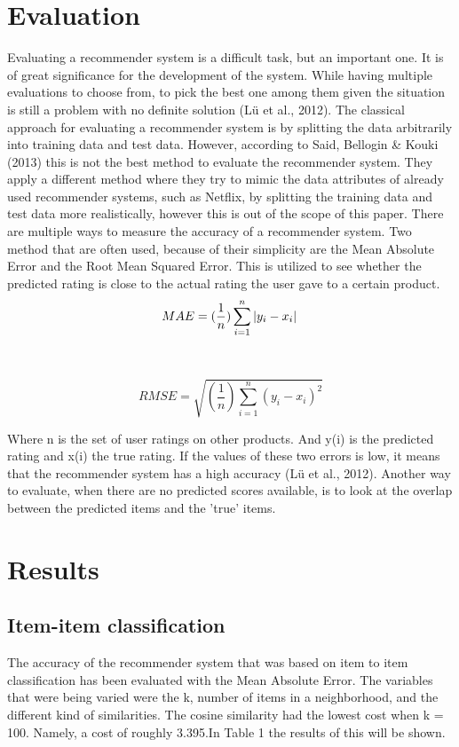 \documentclass[11pt]{article}
\begin{document}
\section{Evaluation}
Evaluating a recommender system is a difficult task, but an important one. It is of great significance for the development of the system. While having multiple evaluations to choose from, to pick the best one among them given the situation is still a problem with no definite solution (Lü et al., 2012).  The classical approach for evaluating a recommender system is by splitting the data arbitrarily into training data and test data. However, according to Said, Bellogin \& Kouki (2013) this is not the best method to evaluate the recommender system. They apply a different method where they try to mimic the data attributes of already used recommender systems, such as Netflix, by splitting the training data and test data more realistically, however this is out of the scope of this paper. There are multiple ways to measure the accuracy of a recommender system. Two method that are often used, because of their simplicity are the Mean Absolute Error and the Root Mean Squared Error. This is utilized to see whether the predicted rating is close to the actual rating the user gave to a certain product.\\

\m
$$MAE =  (\frac{1}{n})\sum_{i=1}^{n}\left | y_{i} - x_{i} \right |\\ $$\\
\\$$RMSE=\sqrt{(\frac{1}{n})\sum_{i=1}^{n}(y_{i} - x_{i})^{2}} $$

Where n is the set of user ratings on other products. And y(i) is the predicted rating and x(i)  the true rating. 
If the values of these two errors is low, it means that the recommender system has a high accuracy (Lü et al., 2012). Another way to evaluate, when there are no predicted scores available, is to look at the overlap between the predicted items and the 'true' items.


\section{Results}
\subsection{Item-item classification}
The accuracy of the recommender system that was based on item to item classification has been evaluated with the Mean Absolute Error. The variables that were being varied were the k, number of items in a neighborhood, and the different kind of similarities. The cosine similarity had the lowest cost when k = 100. Namely, a cost of roughly 3.395.In Table 1 the results of this will be shown.\\ 
\end{document}
